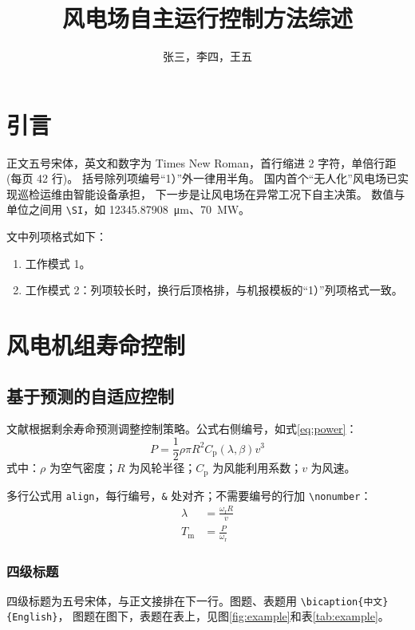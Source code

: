 \documentclass{csee-report}
\title{风电场自主运行控制方法综述}
\author{张三，李四，王五}
\affil{华中科技大学电气与电子工程学院，湖北省 武汉市 430074}
\begin{document}
\maketitle

\section{引言}
正文五号宋体，英文和数字为 Times New Roman，首行缩进 2 字符，单倍行距(每页 42 行)。
括号除列项编号“1）”外一律用半角。
国内首个“无人化”风电场已实现巡检运维由智能设备承担\cite{zhao2025wuren}，
下一步是让风电场在异常工况下自主决策\cite{barker2020resilient,meyers2022flow}。
数值与单位之间用 \verb|\SI|，如 \SI{12345.87908}{\micro\metre}、\SI{70}{MW}。

文中列项格式如下：
\begin{enumerate}
  \item 工作模式 1。
  \item 工作模式 2：列项较长时，换行后顶格排，与机报模板的“1）”列项格式一致。
\end{enumerate}

\section{风电机组寿命控制}
\subsection{基于预测的自适应控制}
文献\cite{kipchirchir2023prognostics}根据剩余寿命预测调整控制策略。公式右侧编号，如式\eqref{eq:power}：
\begin{equation}
  P = \frac{1}{2}\rho \pi R^{2} C_\mathrm{p}(\lambda,\beta) v^{3}
  \label{eq:power}
\end{equation}
式中：$\rho$ 为空气密度；$R$ 为风轮半径；$C_\mathrm{p}$ 为风能利用系数；$v$ 为风速。

多行公式用 \verb|align|，每行编号，\verb|&| 处对齐；不需要编号的行加 \verb|\nonumber|：
\begin{align}
  \lambda &= \frac{\omega_\mathrm{r} R}{v} \label{eq:tsr} \\
  T_\mathrm{m} &= \frac{P}{\omega_\mathrm{r}}
\end{align}

\subsubsection{四级标题}
四级标题为五号宋体，与正文接排在下一行。图题、表题用 \verb|\bicaption{中文}{English}|，
图题在图下，表题在表上，见图\ref{fig:example}和表\ref{tab:example}。
\end{document}
